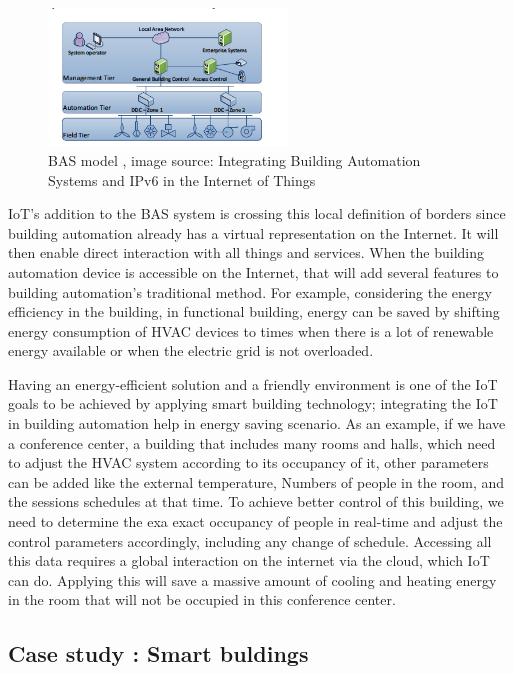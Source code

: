 \documentclass[conference]{IEEEtran}
\begin{document}
\begin{figure}[h!]
	\centering
	\includegraphics[width=2.5in]{newIOt.png}
	\caption{\label{new}  BAS  model
		, image source: Integrating Building Automation Systems and IPv6
in the Internet of Things
		\cite{NewIOT} }
\end{figure}



IoT's addition to the BAS system is crossing this local definition of borders since building automation already has a virtual representation on the Internet. It will then enable direct interaction with all things and services. When the building automation device is accessible on the Internet, that will add several features to building automation's traditional method. For example, considering the energy efficiency in the building, in functional building\cite{NewIOT}, energy can be saved by shifting energy consumption of HVAC devices to times when there is a lot of renewable energy available or when the electric grid is not overloaded. 


Having an energy-efficient solution and a friendly environment is one of the IoT goals to be achieved by applying smart building technology; integrating the IoT in building automation help in energy saving scenario. As an example\cite{NewIOT}, if we have a conference center, a building that includes many rooms and halls, which need to adjust the HVAC system according to its occupancy of it, other parameters can be added like the external temperature, Numbers of people in the room, and the sessions schedules at that time. To achieve better control of this building, we need to determine the exa exact occupancy of people in real-time and adjust the control parameters accordingly, including any change of schedule. Accessing all this data requires a global interaction on the internet via the cloud, which IoT can do. Applying this will save a massive amount of cooling and heating energy in the room that will not be occupied in this conference center. 


\subsection{Case study : Smart buldings}
\end{document}

